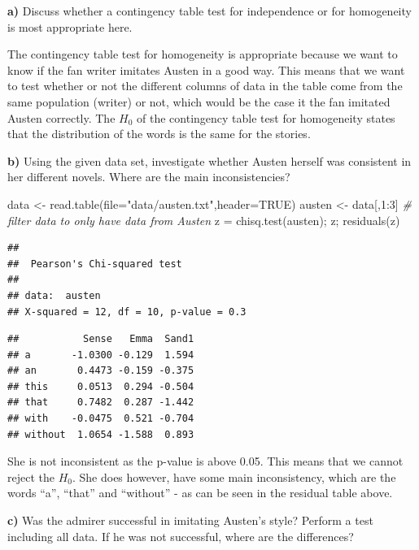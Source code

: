 \documentclass[
  10pt,
]{article}
\newenvironment{Shaded}{\begin{snugshade}}{\end{snugshade}}
\newcommand{\AttributeTok}[1]{\textcolor[rgb]{0.77,0.63,0.00}{#1}}
\newcommand{\CommentTok}[1]{\textcolor[rgb]{0.56,0.35,0.01}{\textit{#1}}}
\newcommand{\ConstantTok}[1]{\textcolor[rgb]{0.00,0.00,0.00}{#1}}
\newcommand{\DecValTok}[1]{\textcolor[rgb]{0.00,0.00,0.81}{#1}}
\newcommand{\FunctionTok}[1]{\textcolor[rgb]{0.00,0.00,0.00}{#1}}
\newcommand{\NormalTok}[1]{#1}
\newcommand{\OtherTok}[1]{\textcolor[rgb]{0.56,0.35,0.01}{#1}}
\newcommand{\SpecialCharTok}[1]{\textcolor[rgb]{0.00,0.00,0.00}{#1}}
\newcommand{\StringTok}[1]{\textcolor[rgb]{0.31,0.60,0.02}{#1}}
\begin{document}
\textbf{a)} Discuss whether a contingency table test for independence or
for homogeneity is most appropriate here.

The contingency table test for homogeneity is appropriate because we
want to know if the fan writer imitates Austen in a good way. This means
that we want to test whether or not the different columns of data in the
table come from the same population (writer) or not, which would be the
case it the fan imitated Austen correctly. The \(H_0\) of the
contingency table test for homogeneity states that the distribution of
the words is the same for the stories.

\textbf{b)} Using the given data set, investigate whether Austen herself
was consistent in her different novels. Where are the main
inconsistencies?

\begin{Shaded}
\begin{Highlighting}[]
\NormalTok{data }\OtherTok{\textless{}{-}} \FunctionTok{read.table}\NormalTok{(}\AttributeTok{file=}\StringTok{"data/austen.txt"}\NormalTok{,}\AttributeTok{header=}\ConstantTok{TRUE}\NormalTok{)}
\NormalTok{austen }\OtherTok{\textless{}{-}}\NormalTok{ data[,}\DecValTok{1}\SpecialCharTok{:}\DecValTok{3}\NormalTok{] }\CommentTok{\# filter data to only have data from Austen}
\NormalTok{z }\OtherTok{=} \FunctionTok{chisq.test}\NormalTok{(austen); z; }\FunctionTok{residuals}\NormalTok{(z)}
\end{Highlighting}
\end{Shaded}

\begin{verbatim}
## 
##  Pearson's Chi-squared test
## 
## data:  austen
## X-squared = 12, df = 10, p-value = 0.3
\end{verbatim}

\begin{verbatim}
##           Sense   Emma  Sand1
## a       -1.0300 -0.129  1.594
## an       0.4473 -0.159 -0.375
## this     0.0513  0.294 -0.504
## that     0.7482  0.287 -1.442
## with    -0.0475  0.521 -0.704
## without  1.0654 -1.588  0.893
\end{verbatim}

She is not inconsistent as the p-value is above 0.05. This means that we
cannot reject the \(H_0\). She does however, have some main
inconsistency, which are the words ``a'', ``that'' and ``without'' - as
can be seen in the residual table above.

\textbf{c)} Was the admirer successful in imitating Austen's style?
Perform a test including all data. If he was not successful, where are
the differences?
\end{document}

